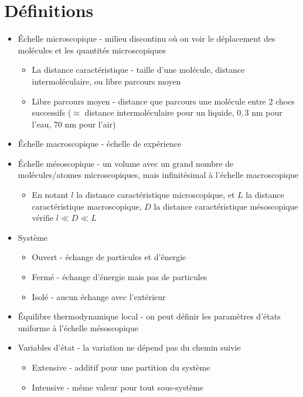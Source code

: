 \documentclass[openany]{book}
\begin{document}
\section{Définitions}
\begin{itemize}
    \item Échelle microscopique - milieu discontinu où on voir le déplacement des molécules et les quantités microscopiques
    \begin{itemize}
        \item La distance caractéristique - taille d'une molécule, distance intermoléculaire, ou libre parcours moyen
        \item Libre parcours moyen - distance que parcours une molécule entre 2 chocs successifs ($\approx$ distance intermoléculaire pour un liquide, $0,3$ nm pour l'eau, $70$ nm pour l'air)
    \end{itemize}
    \item Échelle macroscopique - échelle de expérience
    \item Échelle mésoscopique - un volume avec un grand nombre de molécules/atomes microscopiques, mais infinitésimal à l'échelle macroscopique
    \begin{itemize}
        \item En notant $l$ la distance caractéristique microscopique, et $L$ la distance caractéristique macroscopique, $D$ la distance caractéristique mésoscopique vérifie $l \ll D \ll L$
    \end{itemize}
    \item Système
    \begin{itemize}
        \item Ouvert - échange de particules et d'énergie
        \item Fermé - échange d'énergie mais pas de particules
        \item Isolé - aucun échange avec l'extérieur
    \end{itemize}
    \item Équilibre thermodynamique local - on peut définir les paramètres d'états uniforme à l'échelle mésoscopique
    \item Variables d'état - la variation ne dépend pas du chemin suivie
    \begin{itemize}
        \item Extensive - additif pour une partition du système
        \item Intensive - même valeur pour tout sous-système
    \end{itemize}
\end{itemize}
\end{document}
